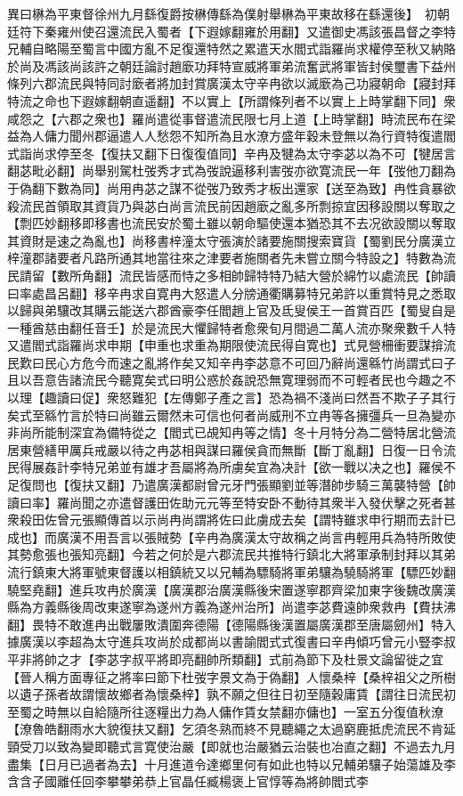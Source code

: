 異曰楙為平東督徐州九月繇復爵按楙傳繇為僕射舉楙為平東故移在繇還後】　初朝廷符下秦雍州使召還流民入蜀者【下遐嫁翻雍於用翻】又遣御史馮該張昌督之李特兄輔自略陽至蜀言中國方亂不足復還特然之累遣天水閻式詣羅尚求權停至秋又納賂於尚及馮該尚該許之朝廷論討趙廞功拜特宣威將軍弟流奮武將軍皆封侯璽書下益州條列六郡流民與特同討廞者將加封賞廣漢太守辛冉欲以滅廞為己功寢朝命【寢封拜特流之命也下遐嫁翻朝直遥翻】不以實上【所謂條列者不以實上上時掌翻下同】衆咸怨之【六郡之衆也】羅尚遣從事督遣流民限七月上道【上時掌翻】時流民布在梁益為人傭力聞州郡逼遣人人愁怨不知所為且水潦方盛年穀未登無以為行資特復遣閻式詣尚求停至冬【復扶又翻下日復復值同】辛冉及犍為太守李苾以為不可【犍居言翻苾毗必翻】尚舉别駕杜弢秀才式為弢說逼移利害弢亦欲寛流民一年【弢他刀翻為于偽翻下數為同】尚用冉苾之謀不從弢乃致秀才板出還家【送至為致】冉性貪暴欲殺流民首領取其資貨乃與苾白尚言流民前因趙廞之亂多所剽掠宜因移設關以奪取之【剽匹妙翻移即移書也流民安於蜀土雖以朝命驅使還本猶恐其不去况欲設關以奪取其資財是速之為亂也】尚移書梓潼太守張演於諸要施關搜索寶貨【蜀劉民分廣漢立梓潼郡諸要者凡路所通其地當往來之津要者施關者先未嘗立關今特設之】特數為流民請留【數所角翻】流民皆感而恃之多相帥歸特特乃結大營於綿竹以處流民【帥讀曰率處昌呂翻】移辛冉求自寛冉大怒遣人分牓通衢購募特兄弟許以重賞特見之悉取以歸與弟驤改其購云能送六郡酋豪李任閻趙上官及氐叟侯王一首賞百匹【蜀叟自是一種酋慈由翻任音壬】於是流民大懼歸特者愈衆旬月間過二萬人流亦聚衆數千人特又遣閻式詣羅尚求申期【申重也求重為期限使流民得自寛也】式見營柵衝要謀揜流民歎曰民心方危今而速之亂將作矣又知辛冉李苾意不可回乃辭尚還緜竹尚謂式曰子且以吾意告諸流民今聽寛矣式曰明公惑於姦說恐無寛理弱而不可輕者民也今趣之不以理【趣讀曰促】衆怒難犯【左傳鄭子產之言】恐為禍不淺尚曰然吾不欺子子其行矣式至緜竹言於特曰尚雖云爾然未可信也何者尚威刑不立冉等各擁彊兵一旦為變亦非尚所能制深宜為備特從之【閻式已覘知冉等之情】冬十月特分為二營特居北營流居東營繕甲厲兵戒嚴以待之冉苾相與謀曰羅侯貪而無斷【斷丁亂翻】日復一日令流民得展姦計李特兄弟並有雄才吾屬將為所虜矣宜為决計【欲一戰以决之也】羅侯不足復問也【復扶又翻】乃遣廣漢都尉曾元牙門張顯劉並等潛帥步騎三萬襲特營【帥讀曰率】羅尚聞之亦遣督護田佐助元元等至特安卧不動待其衆半入發伏擊之死者甚衆殺田佐曾元張顯傳首以示尚冉尚謂將佐曰此虜成去矣【謂特雖求申行期而去計已成也】而廣漢不用吾言以張賊勢【辛冉為廣漢太守故稱之尚言冉輕用兵為特所敗使其勢愈張也張知亮翻】今若之何於是六郡流民共推特行鎮北大將軍承制封拜以其弟流行鎮東大將軍號東督護以相鎮統又以兄輔為驃騎將軍弟驤為驍騎將軍【驃匹妙翻驍堅堯翻】進兵攻冉於廣漢【廣漢郡治廣漢縣後宋置遂寧郡齊梁加東字後魏改廣漢縣為方義縣後周改東遂寧為遂州方義為遂州治所】尚遣李苾費遠帥衆救冉【費扶沸翻】畏特不敢進冉出戰屢敗潰圍奔德陽【德陽縣後漢置屬廣漢郡至唐屬劒州】特入據廣漢以李超為太守進兵攻尚於成都尚以書諭閻式式復書曰辛冉傾巧曾元小豎李叔平非將帥之才【李苾字叔平將即亮翻帥所類翻】式前為節下及杜景文論留徙之宜【晉人稱方面專征之將率曰節下杜弢字景文為于偽翻】人懷桑梓【桑梓祖父之所樹以遺子孫者故謂懷故鄉者為懷桑梓】孰不願之但往日初至隨穀庸賃【謂往日流民初至蜀之時無以自給隨所往逐糧出力為人傭作賃女禁翻亦傭也】一室五分復值秋潦【潦魯皓翻雨水大貌復扶又翻】乞須冬熟而終不見聽繩之太過窮鹿抵虎流民不肯延頸受刀以致為變即聽式言寛使治嚴【即就也治嚴猶云治裝也冶直之翻】不過去九月盡集【日月已過者為去】十月進道令達鄉里何有如此也特以兄輔弟驤子始蕩雄及李含含子國離任回李攀攀弟恭上官晶任臧楊褒上官惇等為將帥閻式李